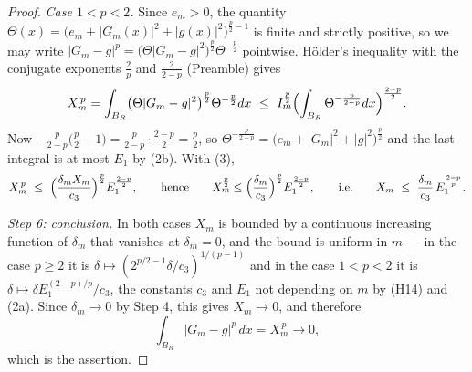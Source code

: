 \begin{proof}
\emph{Case $1<p<2$.}  Since $e_m>0$, the quantity
$\Theta(x)=\bigl(e_m+|G_m(x)|^2+|g(x)|^2\bigr)^{\frac p2-1}$ is finite and
strictly positive, so we may write
$|G_m-g|^p=\bigl(\Theta|G_m-g|^2\bigr)^{\frac p2}\Theta^{-\frac p2}$ pointwise.
Hölder's inequality with the conjugate exponents $\frac2p$ and $\frac2{2-p}$
(Preamble) gives
\[
X_m^{\,p}=\int_{B_R}\bigl(\Theta|G_m-g|^2\bigr)^{\frac p2}\Theta^{-\frac p2}dx
\ \le\ I_m^{\frac p2}
\Bigl(\int_{B_R}\Theta^{-\frac p{2-p}}dx\Bigr)^{\frac{2-p}2} .
\]
Now $-\frac p{2-p}\bigl(\frac p2-1\bigr)=\frac p{2-p}\cdot\frac{2-p}2=\frac p2$,
so $\Theta^{-\frac p{2-p}}=\bigl(e_m+|G_m|^2+|g|^2\bigr)^{\frac p2}$ and the
last integral is at most $E_1$ by (2b).  With (3),
\[
X_m^{\,p}\ \le\ \Bigl(\frac{\delta_mX_m}{c_3}\Bigr)^{\frac p2}E_1^{\frac{2-p}2},
\qquad\text{hence}\qquad
X_m^{\frac p2}\le\Bigl(\frac{\delta_m}{c_3}\Bigr)^{\frac p2}E_1^{\frac{2-p}2},
\qquad\text{i.e.}\qquad
X_m\ \le\ \frac{\delta_m}{c_3}\,E_1^{\frac{2-p}p} .
\]

\emph{Step 6: conclusion.}  In both cases $X_m$ is bounded by a continuous
increasing function of $\delta_m$ that vanishes at $\delta_m=0$, and the bound
is uniform in $m$ --- in the case $p\ge2$ it is
$\delta\mapsto(2^{p/2-1}\delta/c_3)^{1/(p-1)}$ and in the case $1<p<2$ it is
$\delta\mapsto\delta E_1^{(2-p)/p}/c_3$, the constants $c_3$ and $E_1$ not
depending on $m$ by (H14) and (2a).  Since $\delta_m\to0$ by Step 4, this gives
$X_m\to0$, and therefore
\[
\int_{B_R}|G_m-g|^p\,dx=X_m^{\,p}\longrightarrow0 ,
\]
which is the assertion.
\end{proof}
